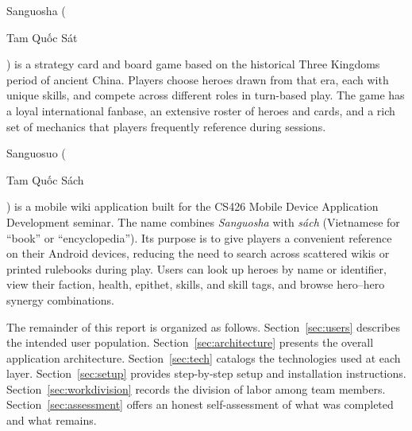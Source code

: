 Sanguosha (\begin{otherlanguage}{vietnamese}Tam Quốc Sát\end{otherlanguage}) is a strategy card and board game based on the historical Three Kingdoms period of ancient China. Players choose heroes drawn from that era, each with unique skills, and compete across different roles in turn-based play. The game has a loyal international fanbase, an extensive roster of heroes and cards, and a rich set of mechanics that players frequently reference during sessions.

Sanguosuo (\begin{otherlanguage}{vietnamese}Tam Quốc Sách\end{otherlanguage}) is a mobile wiki application built for the CS426 Mobile Device Application Development seminar. The name combines \emph{Sanguosha} with \emph{s\'ach} (Vietnamese for ``book'' or ``encyclopedia''). Its purpose is to give players a convenient reference on their Android devices, reducing the need to search across scattered wikis or printed rulebooks during play. Users can look up heroes by name or identifier, view their faction, health, epithet, skills, and skill tags, and browse hero--hero synergy combinations.

The remainder of this report is organized as follows. Section~\ref{sec:users} describes the intended user population. Section~\ref{sec:architecture} presents the overall application architecture. Section~\ref{sec:tech} catalogs the technologies used at each layer. Section~\ref{sec:setup} provides step-by-step setup and installation instructions. Section~\ref{sec:workdivision} records the division of labor among team members. Section~\ref{sec:assessment} offers an honest self-assessment of what was completed and what remains.
